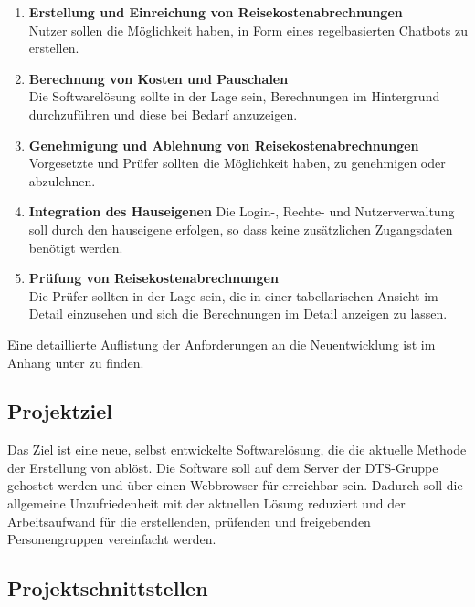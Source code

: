 \begin{enumerate}
    \item \textbf{Erstellung und Einreichung von Reisekostenabrechnungen}\\
    Nutzer sollen die Möglichkeit haben,  in Form eines regelbasierten Chatbots zu erstellen.
    \item \textbf{Berechnung von Kosten und Pauschalen}\\
    Die Softwarelösung sollte in der Lage sein, Berechnungen im Hintergrund durchzuführen und diese bei Bedarf anzuzeigen.
    \item \textbf{Genehmigung und Ablehnung von Reisekostenabrechnungen}\\
    Vorgesetzte und Prüfer sollten die Möglichkeit haben,  zu genehmigen oder abzulehnen.
    \item \textbf{Integration des Hauseigenen }
    Die Login-, Rechte- und Nutzerverwaltung soll durch den hauseigene  erfolgen, so dass keine zusätzlichen Zugangsdaten benötigt werden.
    \item \textbf{Prüfung von Reisekostenabrechnungen}\\
    Die Prüfer sollten in der Lage sein, die  in einer tabellarischen Ansicht im Detail einzusehen und sich die Berechnungen im Detail anzeigen zu lassen.
\end{enumerate}

Eine detaillierte Auflistung der Anforderungen an die Neuentwicklung ist im Anhang unter  zu finden.


\subsection{Projektziel}
\label{sec:Einführung-Definitionsphase:Projektziel}

Das Ziel ist eine neue, selbst entwickelte Softwarelösung, die die aktuelle Methode der Erstellung von  ablöst. Die Software soll auf dem Server der DTS-Gruppe gehostet werden und über einen Webbrowser für  erreichbar sein. Dadurch soll die allgemeine Unzufriedenheit mit der aktuellen Lösung reduziert und der Arbeitsaufwand für die erstellenden, prüfenden und freigebenden Personengruppen vereinfacht werden.

\subsection{Projektschnittstellen}
\label{sec:Einführung-Definitionsphase:Projektschnittstellen}

